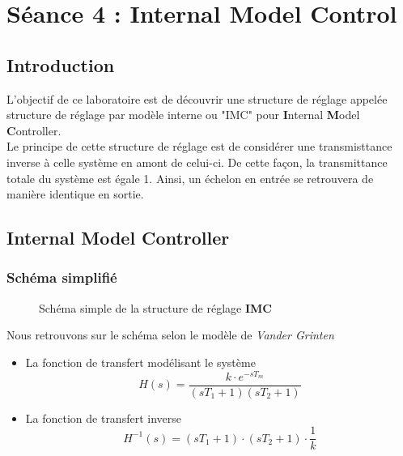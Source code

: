 \section{Séance 4 : Internal Model Control}
\subsection{Introduction}
L'objectif de ce laboratoire est de découvrir une structure de réglage appelée structure de réglage par modèle interne ou "IMC" pour \textbf{I}nternal \textbf{M}odel \textbf{C}ontroller.\\

Le principe de cette structure de réglage est de considérer une transmisttance inverse à celle système en amont de celui-ci. De cette façon, la transmittance totale du système est égale 1. Ainsi, un échelon en entrée se retrouvera de manière identique en sortie.\\

\subsection{Internal Model Controller}
\subsubsection{Schéma simplifié}
\begin{figure}[H]

\caption{Schéma simple de la structure de réglage \textbf{IMC}}
\end{figure}

Nous retrouvons sur le schéma selon le modèle de \textit{Vander Grinten}
\begin{itemize}
\item La fonction de transfert modélisant le système 
\begin{equation}
H(s) = \frac{k \cdot e^{-sT_{m}}}{(sT_{1} + 1)(sT_{2} + 1)} 
\end{equation}

\item La fonction de transfert inverse
\begin{equation}
H^{-1}(s) = (sT_{1} + 1) \cdot (sT_{2} + 1) \cdot \frac{1}{k}
\end{equation} 
\end{itemize}

